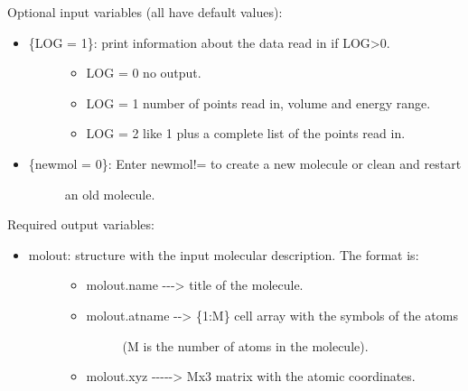 \documentclass[a4paper]{article}
\begin{document}
Optional input variables (all have default values):
%
\begin{itemize}

\item %
\begin{description}
\item[{\{LOG = 1\}: print information about the data read in if LOG>0.}] \leavevmode %
\begin{itemize}

\item LOG = 0  no output.

\item LOG = 1  number of points read in, volume and energy range.

\item LOG = 2  like 1 plus a complete list of the points read in.

\end{itemize}

\end{description}

\item %
\begin{description}
\item[{\{newmol = 0\}: Enter newmol!= to create a new molecule or clean and restart}] \leavevmode 
an old molecule.

\end{description}

\end{itemize}

Required output variables:
%
\begin{itemize}

\item %
\begin{description}
\item[{molout: structure with the input molecular description. The format is:}] \leavevmode %
\begin{itemize}

\item molout.name -{}-{}-> title of the molecule.

\item %
\begin{description}
\item[{molout.atname -{}-> \{1:M\} cell array with the symbols of the atoms}] \leavevmode 
(M is the number of atoms in the molecule).

\end{description}

\item molout.xyz -{}-{}-{}-{}-> Mx3 matrix with the atomic coordinates.

\end{itemize}

\end{description}

\end{itemize}
\end{document}
